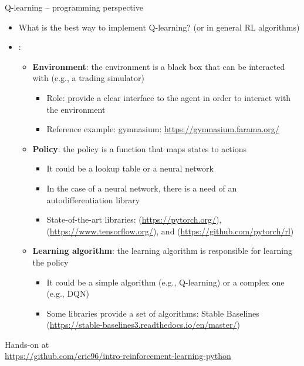 \documentclass[presentation, 9pt]{beamer}\mode<presentation>{\usetheme{AMSBolognaFC}}
\begin{document}
\begin{frame}{Q-learning -- programming perspective}
	\begin{itemize}
		\item What is the best way to implement Q-learning? (or in general RL algorithms)
		\item {}:
		\begin{itemize}
			\item \textbf{Environment}: the environment is a black box that can be interacted with (e.g., a trading simulator)
			\begin{itemize}
				\item Role: provide a clear interface to the agent in order to interact with the environment
				\item Reference example: gymnasium: \url{https://gymnasium.farama.org/}
			\end{itemize}
			\item \textbf{Policy}: the policy is a function that maps states to actions
			\begin{itemize}
				\item It could be a lookup table or a neural network
				\item In the case of a neural network, there is a need of an autodifferentiation library
				\item State-of-the-art libraries:  (\url{https://pytorch.org/}),  (\url{https://www.tensorflow.org/}), and  (\url{https://github.com/pytorch/rl})
			\end{itemize}
			\item \textbf{Learning algorithm}: the learning algorithm is responsible for learning the policy
			\begin{itemize}
				\item It could be a simple algorithm (e.g., Q-learning) or a complex one (e.g., DQN)
				\item Some libraries provide a set of algorithms: Stable Baselines (\url{https://stable-baselines3.readthedocs.io/en/master/})
			\end{itemize}
		\end{itemize}
	\end{itemize}
	\centering 
	\Large Hands-on at \\ \large \url{https://github.com/cric96/intro-reinforcement-learning-python}
\end{frame}
\end{document}
